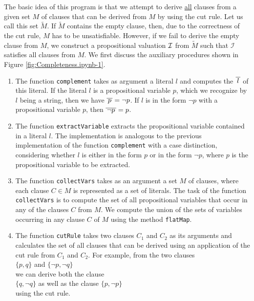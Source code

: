 The basic idea
of this program is that we attempt to derive \underline{all} clauses from a given set $M$ of clauses
that can be derived from $M$ by using the cut rule.  Let us call this set $\widetilde{M}$.  If $\widetilde{M}$ contains the empty clause,
then, due to the correctness of the cut rule, $M$ has to be unsatisfiable. However, if we fail to derive the empty clause from $M$,
we construct a propositional valuation
$\mathcal{I}$ from $\widetilde{M}$ such that $\mathcal{I}$ satisfies all clauses from $M$.
We first discuss the auxiliary procedures shown in Figure \ref{fig:Completeness.ipynb-1}.
\begin{enumerate}
\item The function \texttt{complement} takes as argument a literal $l$ and computes the
       $\overline{\,l\,}$ of this literal.
      If the literal $l$ is a propositional variable $p$, which we recognize by $l$ being a string,
      then we have $\overline{\,p\,} = \neg p$.
      If $l$ is in the form $\neg p$ with a propositional variable $p$, then $\overline{\,\neg p\,} =
      p$.
\item The function \texttt{extractVariable} extracts the propositional variable contained in a literal $l$.
      The implementation is analogous to the previous implementation of the function 
      \texttt{complement} with a case distinction, considering whether $l$ is either in the form
      $p$ or in the form $\neg p$, where $p$ is the propositional variable to be extracted.
\item The function \texttt{collectVars} takes as an argument a set $M$ of clauses, where each
      clause \mbox{$C \!\in\! M$} is represented as a set of literals. The task of the
      function \texttt{collectVars} is to compute the set of all propositional variables
      that occur in any of the clauses $C$ from $M$. We compute the union of the sets of variables occurring
      in any clause $C$ of $M$ using the method \texttt{flatMap}.
\item The function \texttt{cutRule} takes two clauses $C_1$ and $C_2$ as its arguments and calculates
      the set of all clauses that can be derived using an application of the cut rule from $C_1$ and $C_2$.
      For example, from the two clauses
      \\[0.2cm]
      \hspace*{1.3cm}
      $\{ p, q \}$ \quad and \quad $\{ \neg p, \neg q \}$ 
      \\[0.2cm]
      we can derive both the clause
      \\[0.2cm]
      \hspace*{1.3cm}
      $\{q, \neg q\}$ \quad as well as the clause \quad $\{p, \neg p \}$
      \\[0.2cm]
      using the cut rule.
\end{enumerate}


